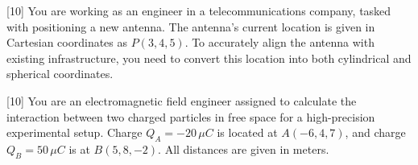 \documentclass[12pt, a4paper]{exam}
\begin{document}




\begin{questions}
	\pointsinrightmargin
	[10]
	You are working as an engineer in a telecommunications company, tasked with positioning a new antenna. The antenna's current location is given in Cartesian coordinates as $P(3, 4, 5)$. To accurately align the antenna with existing infrastructure, you need to convert this location into both cylindrical and spherical coordinates. 
	
		
	\vspace{0.2in}
	
	[10]
	You are an electromagnetic field engineer assigned to calculate the interaction between two charged particles in free space for a high-precision experimental setup. Charge $Q_A = -20 \, \mu C$ is located at $A(-6, 4, 7)$, and charge $Q_B = 50 \, \mu C$ is at $B(5, 8, -2)$. All distances are given in meters.
\end{questions}
\end{document}
